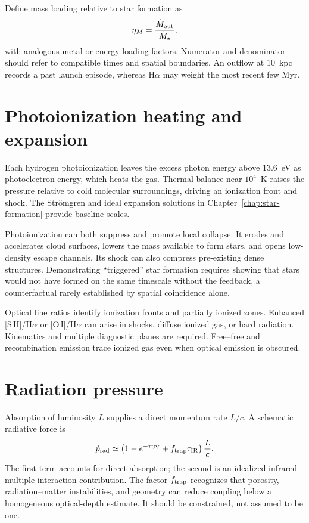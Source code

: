 Define mass loading relative to star formation as
\begin{equation}
 \eta_M=\frac{\dot M_{\rm out}}{\dot M_\star},
 \label{eq:mass-loading}
\end{equation}
with analogous metal or energy loading factors.  Numerator and denominator should
refer to compatible times and spatial boundaries.  An outflow at 10~kpc records a
past launch episode, whereas H$\alpha$ may weight the most recent few Myr.

\section{Photoionization heating and expansion}

Each hydrogen photoionization leaves the excess photon energy above 13.6~eV as
photoelectron energy, which heats the gas.  Thermal balance near $10^4$~K raises the
pressure relative to cold molecular surroundings, driving an ionization front and
shock.  The Str\"omgren and ideal expansion solutions in
Chapter~\ref{chap:star-formation} provide baseline scales.

Photoionization can both suppress and promote local collapse.  It erodes and
accelerates cloud surfaces, lowers the mass available to form stars, and opens
low-density escape channels.  Its shock can also compress pre-existing dense
structures.  Demonstrating ``triggered'' star formation requires showing that stars
would not have formed on the same timescale without the feedback, a counterfactual
rarely established by spatial coincidence alone.

Optical line ratios identify ionization fronts and partially ionized zones.  Enhanced
[S\,II]/H$\alpha$ or [O\,I]/H$\alpha$ can arise in shocks, diffuse ionized gas, or hard
radiation.  Kinematics and multiple diagnostic planes are required.  Free--free and
recombination emission trace ionized gas even when optical emission is obscured.

\section{Radiation pressure}

Absorption of luminosity $L$ supplies a direct momentum rate $L/c$.  A schematic
radiative force is
\begin{equation}
 \dot p_{\rm rad}\simeq
 \left(1-e^{-\tau_{\rm UV}}+f_{\rm trap}\tau_{\rm IR}\right)\frac{L}{c}.
 \label{eq:radiation-momentum}
\end{equation}
The first term accounts for direct absorption; the second is an idealized infrared
multiple-interaction contribution.  The factor $f_{\rm trap}$ recognizes that
porosity, radiation--matter instabilities, and geometry can reduce coupling below a
homogeneous optical-depth estimate.  It should be constrained, not assumed to be one.


